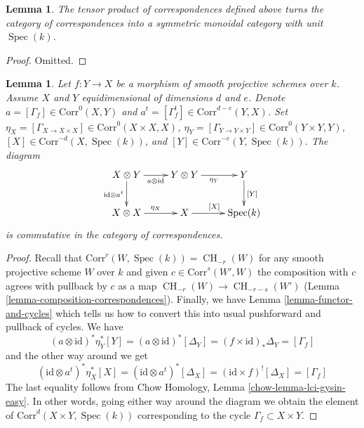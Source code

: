 \documentclass{stacks-project}
\theoremstyle{plain}
\newtheorem{lemma}[subsection]{Lemma}
\theoremstyle{definition}
\theoremstyle{remark}
\numberwithin{equation}{subsection}
\def\Spec{\mathop{\mathrm{Spec}}}
\def\CH{\mathop{\mathrm{CH}}\nolimits}
\begin{document}
\begin{lemma}
\label{lemma-tensor-product}
The tensor product of correspondences defined above turns the category of
correspondences into a symmetric monoidal category with unit $\Spec(k)$.
\end{lemma}

\begin{proof}
Omitted.
\end{proof}

\begin{lemma}
\label{lemma-prep-dual}
Let $f : Y \to X$ be a morphism of smooth projective schemes over $k$.
Assume $X$ and $Y$ equidimensional of dimensions $d$ and $e$.
Denote $a = [\Gamma_f] \in \text{Corr}^0(X, Y)$ and
$a^t = [\Gamma_f^t] \in \text{Corr}^{d - e}(Y, X)$.
Set
$\eta_X = [\Gamma_{X \to X \times X}] \in \text{Corr}^0(X \times X, X)$,
$\eta_Y = [\Gamma_{Y \to Y \times Y}] \in \text{Corr}^0(Y \times Y, Y)$,
$[X] \in \text{Corr}^{-d}(X, \Spec(k))$, and
$[Y] \in \text{Corr}^{-e}(Y, \Spec(k))$. The diagram
$$
\xymatrix{
X \otimes Y \ar[r]_{a \otimes \text{id}} \ar[d]_{\text{id} \otimes a^t} &
Y \otimes Y \ar[r]_{\eta_Y} &
Y \ar[d]^{[Y]} \\
X \otimes X \ar[r]^{\eta_X} &
X \ar[r]^{[X]} &
\Spec(k)
}
$$
is commutative in the category of correspondences.
\end{lemma}

\begin{proof}
Recall that $\text{Corr}^r(W, \Spec(k)) = \CH_{-r}(W)$ for any
smooth projective scheme $W$ over $k$
and given $c \in \text{Corr}^s(W', W)$ the composition
with $c$ agrees with pullback by $c$ as a map
$\CH_{-r}(W) \to \CH_{-r - s}(W')$
(Lemma \ref{lemma-composition-correspondences}).
Finally, we have Lemma \ref{lemma-functor-and-cycles}
which tells us how to convert this into usual
pushforward and pullback of cycles.
We have
$$
(a \otimes \text{id})^* \eta_Y^* [Y] =
(a \otimes \text{id})^* [\Delta_Y] =
(f \times \text{id})_*\Delta_Y = [\Gamma_f]
$$
and the other way around we get
$$
(\text{id} \otimes a^t)^* \eta_X^* [X] =
(\text{id} \otimes a^t)^* [\Delta_X] =
(\text{id} \times f)^![\Delta_X] = [\Gamma_f]
$$
The last equality follows from
Chow Homology, Lemma \ref{chow-lemma-lci-gysin-easy}.
In other words, going either way around the diagram we
obtain the element of $\text{Corr}^d(X \times Y, \Spec(k))$
corresponding to the cycle $\Gamma_f \subset X \times Y$.
\end{proof}
\end{document}
